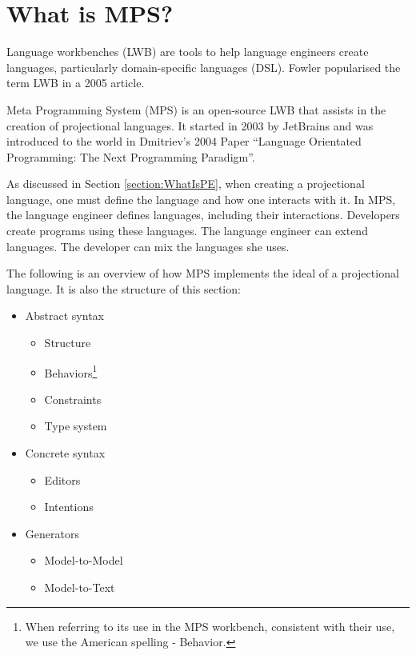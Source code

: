 \section{What is MPS?}
\label{section:MPS}

Language workbenches (LWB) are tools to help language engineers create languages, particularly domain-specific languages (DSL).
Fowler\cite{Fowler_lwb} popularised the term LWB in a 2005 article.

Meta Programming System (MPS) is an open-source LWB that assists in the creation of projectional languages.
It started in 2003 by JetBrains and was introduced to the world in Dmitriev's 2004 Paper ``Language Orientated Programming: The Next Programming Paradigm''\cite{dmitriev2004language}.

As discussed in Section \ref{section:WhatIsPE}, when creating a projectional language, one must define the language and how one interacts with it.
In MPS, the language engineer defines languages, including their interactions.
Developers create programs using these languages.
The language engineer can extend languages.
The developer can mix the languages she uses.

The following is an overview of how MPS implements the ideal of a projectional language.
It is also the structure of this section: 

\begin{itemize}
    \setlength\itemsep{0em}
    \item Abstract syntax
    \begin{itemize}
        \setlength\itemsep{0em}
        \item Structure
        \item Behaviors\footnote{When referring to its use in the MPS workbench, consistent with their use, we use the American spelling - Behavior.}
        \item Constraints
        \item Type system
    \end{itemize}
    \item Concrete syntax
    \begin{itemize}
        \setlength\itemsep{0em}
        \item Editors
        \item Intentions
    \end{itemize}
    \item Generators
    \begin{itemize}
        \setlength\itemsep{0em}
        \item Model-to-Model
        \item Model-to-Text
    \end{itemize}
\end{itemize}

